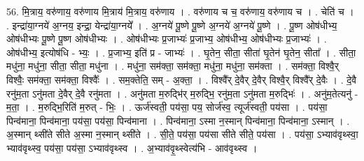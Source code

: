\documentclass[17pt]{extarticle}
\begin{document}
56. मि॒त्राय॒ वरु॑णाय॒ वरु॑णाय मि॒त्राय॑ मि॒त्राय॒ वरु॑णाय । . वरु॑णाय च च॒ वरु॑णाय॒ वरु॑णाय च । . चेति॑ च । . इन्द्रा॑या॒ग्नये॑ अ॒ग्नय॒ इन्द्रा॒ येन्द्रा॑या॒ग्नये᳚ । . अ॒ग्नये॑ पू॒ष्णे पू॒ष्णे अ॒ग्नये॑ अ॒ग्नये॑ पू॒ष्णे । . पू॒ष्ण ओष॑धीभ्य॒ ओष॑धीभ्यः पू॒ष्णे पू॒ष्ण ओष॑धीभ्यः । . ओष॑धीभ्यः प्र॒जाभ्यः॑ प्र॒जाभ्य॒ ओष॑धीभ्य॒ ओष॑धीभ्यः प्र॒जाभ्यः॑ । . ओष॑धीभ्य॒ इत्योष॑धि - भ्यः॒ । . प्र॒जाभ्य॒ इति॑ प्र - जाभ्यः॑ । . घृ॒तेन॒ सीता॒ सीता॑ घृ॒तेन॑ घृ॒तेन॒ सीता᳚ । . सीता॒ मधु॑ना॒ मधु॑ना॒ सीता॒ सीता॒ मधु॑ना । . मधु॑ना॒ सम॑क्ता॒ सम॑क्ता॒ मधु॑ना॒ मधु॑ना॒ सम॑क्ता । . सम॑क्ता॒ विश्वै॒र् विश्वैः॒ सम॑क्ता॒ सम॑क्ता॒ विश्वैः᳚ । . सम॒क्तेति॒ सम् - अ॒क्ता॒ । . विश्वै᳚र् दे॒वैर् दे॒वैर् विश्वै॒र् विश्वै᳚र् दे॒वैः । . दे॒वै रनु॑म॒ता ऽनु॑मता दे॒वैर् दे॒वै रनु॑मता । . अनु॑मता म॒रुद्भि॑र् म॒रुद्भि॒ रनु॑म॒ता ऽनु॑मता म॒रुद्भिः॑ । . अनु॑म॒तेत्यनु॑ - म॒ता॒ । . म॒रुद्भि॒रिति॑ म॒रुत् - भिः॒ । . ऊर्ज॑स्वती॒ पय॑सा॒ पय॒ सोर्ज॑स्व॒ त्यूर्ज॑स्वती॒ पय॑सा । . पय॑सा॒ पिन्व॑माना॒ पिन्व॑माना॒ पय॑सा॒ पय॑सा॒ पिन्व॑माना । . पिन्व॑माना॒ ऽस्मा न॒स्मान् पिन्व॑माना॒ पिन्व॑माना॒ ऽस्मान् । . अ॒स्मान् थ्सी॑ते सीते अ॒स्मा न॒स्मान् थ्सी॑ते । . सी॒ते॒ पय॑सा॒ पय॑सा सीते सीते॒ पय॑सा । . पय॑सा॒ ऽभ्याव॑वृथ्स्वा॒ भ्याव॑वृथ्स्व॒ पय॑सा॒ पय॑सा॒ ऽभ्याव॑वृथ्स्व । . अ॒भ्याव॑वृ॒थ्स्वेत्य॑भि - आव॑वृथ्स्व । \newline
\end{document}
